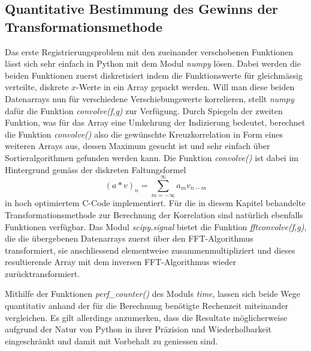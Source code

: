 \subsection{Quantitative Bestimmung des Gewinns der Transformationsmethode
\label{mellin:subsection:gewinn}}
Das erste Registrierungsproblem mit den zueinander verschobenen Funktionen 
lässt sich sehr einfach in Python mit dem Modul {\em numpy} lösen. 
Dabei werden die beiden Funktionen zuerst diskretisiert indem die Funktionswerte 
für gleichmässig verteilte, diskrete $x$-Werte in ein Array gepackt werden.
Will man diese beiden Datenarrays nun für verschiedene Verschiebungswerte 
korrelieren, stellt {\em numpy} dafür die Funktion {\em convolve(f,g)} zur 
Verfügung. 
Durch Spiegeln der zweiten Funktion, was für das Array eine Umkehrung der 
Indizierung bedeutet, berechnet die Funktion {\em convolve()} also die 
gewünschte Kreuzkorrelation in Form eines weiteren Arrays aus, dessen 
Maximum gesucht ist und sehr einfach über Sortieralgorithmen 
gefunden werden kann. 
Die Funktion {\em convolve()} ist dabei im Hintergrund gemäss der diskreten 
Faltungsformel
\[
    (a \ast v)_n = \sum_{m = -\infty}^{\infty} a_m v_{n-m}
\]
in hoch optimiertem C-Code implementiert.
Für die in diesem Kapitel behandelte Transformationsmethode zur Berechnung der 
Korrelation sind natürlich ebenfalls Funktionen verfügbar. 
Das Modul {\em scipy.signal} bietet die Funktion {\em fftconvolve(f,g)}, die die 
übergebenen Datenarrays zuerst über den FFT-Algorithmus 
transformiert, sie anschliessend elementweise zusammenmultipliziert und dieses 
resultierende Array mit dem inversen FFT-Algorithmus wieder zurücktransformiert.

Mithilfe der Funktionen {\em perf\_counter()} des Moduls {\em time}, lassen sich beide 
Wege quantitativ anhand der für die Berechnung benötigte Rechenzeit miteinander 
vergleichen.
Es gilt allerdings anzumerken, dass die Resultate möglicherweise aufgrund der Natur 
von Python in ihrer Präzision und Wiederholbarkeit eingeschränkt und damit mit 
Vorbehalt zu geniessen sind.

